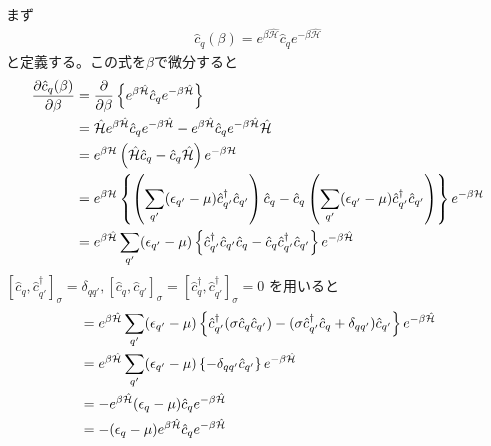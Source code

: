 \documentclass[dvipdfmx, 11pt, a4paper]{jsarticle}
\numberwithin{equation}{section}
\theoremstyle{definition}
\begin{document}
    \begin{derivationBox}
        まず
        \begin{align}
            \hat{c}_q(\beta) = e^{\beta \hat{\mathcal{H}}} \hat{c}_q e^{-\beta \mathcal{\hat{H}}}
        \end{align}
        と定義する。この式を$\beta$で微分すると
        \begin{align}
            \frac{\partial \hat{c}_q (\beta)}{\partial \beta} &= \frac{\partial }{\partial \beta} \left\{ e^{\beta \hat{\mathcal{H}}} \hat{c}_q e^{-\beta \mathcal{\hat{H}}} \right\} \notag \\
            &= \mathcal{\hat{H}} e^{\beta \hat{\mathcal{H}}} \hat{c}_q e^{-\beta \mathcal{\hat{H}}} - e^{\beta \hat{\mathcal{H}}} \hat{c}_q e^{-\beta \mathcal{\hat{H}}} \mathcal{\hat{H}} \notag \\
            &= e^{\beta \mathcal{H}} \left( \mathcal{\hat{H}} \hat{c}_q - \hat{c}_q \mathcal{\hat{H}} \right)e^{-\beta \mathcal{H}} \notag \\
            &= e^{\beta \mathcal{H}} \left\{ \left( \sum_{q'} (\epsilon_{q'} - \mu) \hat{c}_{q'}^\dagger \hat{c}_{q'}  \right) \hat{c}_q - \hat{c}_q \left( \sum_{q'} (\epsilon_{q'} - \mu) \hat{c}_{q'}^\dagger \hat{c}_{q'}  \right) \right\}e^{-\beta \mathcal{H}} \notag \\
            &= e^{\beta \mathcal{\hat{H}}} \sum_{q'} (\epsilon_{q'} - \mu) \left\{ \hat{c}_{q'}^\dagger \hat{c}_{q'} \hat{c}_q - \hat{c}_q \hat{c}_{q'}^\dagger \hat{c}_{q'} \right\} e^{-\beta \mathcal{\hat{H}}} 
        \end{align}
        $\left[ \hat{c}_q,\hat{c}_{q'}^\dagger \right]_\sigma = \delta_{qq'},\left[ \hat{c}_q, \hat{c}_{q'}\right]_\sigma = \left[ \hat{c}_q^\dagger, \hat{c}_{q'}^\dagger\right]_\sigma = 0$
        を用いると
        \begin{align}
            &= e^{\beta \mathcal{\hat{H}}} \sum_{q'} (\epsilon_{q'} - \mu) \left\{ \hat{c}_{q'}^\dagger (\sigma\hat{c}_{q} \hat{c}_{q'}) - (\sigma \hat{c}_{q'}^\dagger \hat{c}_q + \delta_{qq'} )\hat{c}_{q'} \right\} e^{-\beta \mathcal{\hat{H}}} \notag \\
            &= e^{\beta \mathcal{\hat{H}}} \sum_{q'} (\epsilon_{q'} - \mu) \left\{ -\delta_{qq'}\hat{c}_{q'} \right\} e^{-\beta \mathcal{\hat{H}}} \notag \\
            &= -e^{\beta \mathcal{\hat{H}}} (\epsilon_{q} - \mu) \hat{c}_{q} e^{-\beta \mathcal{\hat{H}}} \notag \\
            &= -(\epsilon_{q} - \mu)e^{\beta \mathcal{\hat{H}}}  \hat{c}_{q} e^{-\beta \mathcal{\hat{H}}} \notag \\

\end{align}
\end{derivationBox}
\end{document}
